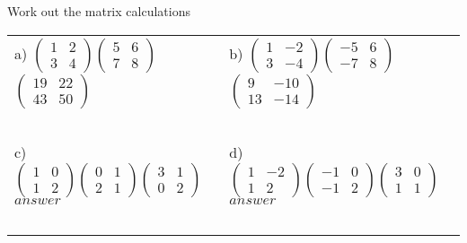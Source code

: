 \documentclass[fontsize=12pt]{scrartcl}
\begin{document}
\newpage
Work out the matrix calculations
\newline
\newline
\begin{tabular}{p{9cm}p{9cm}}
a) $\begin{pmatrix}1&2\\3&4 \end{pmatrix} \begin{pmatrix}5&6\\7&8 \end{pmatrix}$
 \quad $\begin{pmatrix}19&22\\43&50\end{pmatrix}$
&b) $\begin{pmatrix}1&-2\\3&-4 \end{pmatrix} \begin{pmatrix}-5&6\\-7&8 \end{pmatrix}$
 \quad $\begin{pmatrix}9&-10\\13&-14\end{pmatrix}$
\\\\\\
\\\\\\

c) $\begin{pmatrix}1&0\\1&2 \end{pmatrix} \begin{pmatrix}0&1\\2&1 \end{pmatrix} \begin{pmatrix}3&1\\0&2\end{pmatrix}$
 \quad $answer$
&d) $\begin{pmatrix}1&-2\\1&2 \end{pmatrix} \begin{pmatrix}-1&0\\-1&2 \end{pmatrix} \begin{pmatrix}3&0\\1&1\end{pmatrix}$
 \quad $answer$
\\\\\\
\\\\\\


\end{tabular}
\end{document}
